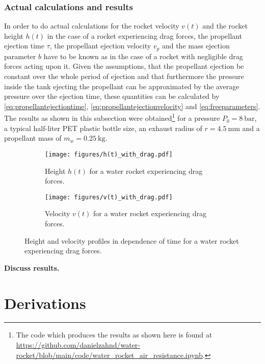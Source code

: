 \documentclass[a4paper,11pt]{report}
\begin{document}
\subsection{Actual calculations and results}
In order to do actual calculations for the rocket velocity $v(t)$ and the rocket height $h(t)$ in the case of a rocket experiencing drag forces, the propellant ejection time $\tau$, the propellant ejection  velocity $v_p$ and the mass ejection parameter $b$ have to be known as in the case of a rocket with negligible drag forces acting upon it. Given the assumptions, that the propellant ejection be constant over the whole period of ejection and that furthermore the pressure inside the tank ejecting the propellant can be approximated by the average pressure over the ejection time, these quantities can be calculated by \cref{eq:propellantejectiontime}, \cref{eq:propellantejectionvelocity} and \cref{eq:freeparameters}. The results as shown in this subsection were obtained\footnote{The code which produces the results as shown here is found at \url{https://github.com/danielzahnd/water-rocket/blob/main/code/water_rocket_air_resistance.ipynb}.} for a pressure $P_0 = \SI{8}{\bar}$, a typical half-liter PET plastic bottle size, an exhaust radius of $r = \SI{4.5}{\milli\meter}$ and a propellant mass of $m_w = \SI{0.25}{\kilo\gram}$.
\begin{figure}[h]
	\begin{subfigure}{0.49\textwidth}
		\centering
		\texttt{[image: figures/h(t)\_with\_drag.pdf]}
		\caption{Height $h(t)$ for a water rocket experiencing drag forces.}
		\label{fig:h(t)_with_drag}
	\end{subfigure} \hfill
	\begin{subfigure}{0.49\textwidth}
		\centering
		\texttt{[image: figures/v(t)\_with\_drag.pdf]}
		\caption{Velocity $v(t)$ for a water rocket experiencing drag forces.}
		\label{fig:v(t)_with_drag}
	\end{subfigure}
	\caption{Height and velocity profiles in dependence of time for a water rocket experiencing drag forces.}
	\label{fig:results1_with_drag}
\end{figure}

\textbf{Discuss results.}

\chapter{Derivations}
\end{document}
